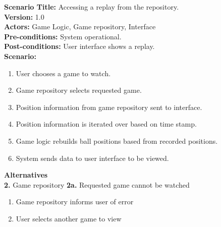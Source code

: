 \documentclass[letterpaper,12pt]{article}
\begin{document}
\noindent \textbf{Scenario Title:} Accessing a replay from the repository.\\
\textbf{Version:} 1.0\\
\textbf{Actors:} Game Logic, Game repository, Interface\\
\textbf{Pre-conditions:} System operational.\\
\textbf{Post-conditions:} User interface shows a replay.\\
\textbf{Scenario:}
\begin{enumerate}
\item User chooses a game to watch.
\item Game repository selects requested game.
\item Position information from game repository sent to interface.
\item Position information is iterated over based on time stamp.
\item Game logic rebuilds ball positions based from recorded positions.
\item System sends data to user interface to be viewed.
\end{enumerate}
\textbf{Alternatives}\\
\textbf{2.} Game repository
\textbf{2a.} Requested game cannot be watched
\begin{enumerate}
\item Game repository informs user of error
\item User selects another game to view
\end {enumerate}
\end{document}
